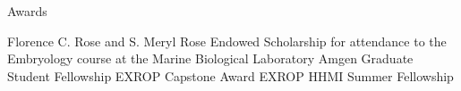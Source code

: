 \begin{rubric}{Awards}

\entry*[2015]
  Florence C. Rose and S. Meryl Rose Endowed Scholarship for attendance to the
  Embryology course at the Marine Biological Laboratory
\entry*[2014]
  Amgen Graduate Student Fellowship
\entry*[2012]
  EXROP Capstone Award
\entry*[2011]
  EXROP HHMI Summer Fellowship

\end{rubric}
